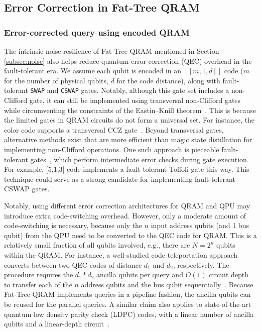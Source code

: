 \subsection{Error Correction in Fat-Tree QRAM}
\label{subsec:qec}
\subsubsection{Error-corrected query using encoded QRAM}
The intrinsic noise resilience of Fat-Tree QRAM mentioned in Section \ref{subsec:noise} also helps reduce quantum error correction (QEC) overhead in the fault-tolerant era. We assume each qubit is encoded in an $[[m, 1, d]]$ code ($m$ for the number of physical qubits, $d$ for the code distance), along with fault-tolerant  \texttt{SWAP} and \texttt{CSWAP} gates. Notably, although this gate set includes a non-Clifford gate, it can still be implemented using transversal non-Clifford gates while circumventing the constraints of the Eastin–Knill theorem~\cite{eastin2009restrictions}. This is because the limited gates in QRAM circuits do not form a universal set.
For instance, the color code supports a transversal CCZ gate~\cite{kubica2015unfolding}. Beyond transversal gates, alternative methods exist that are more efficient than magic state distillation for implementing non-Clifford operations. One such approach is pieceable fault-tolerant gates~\cite{yoder2016universal}, which perform intermediate error checks during gate execution. For example, [5,1,3] code implements a fault-tolerant Toffoli gate this way. This technique could serve as a strong candidate for implementing fault-tolerant CSWAP gates.

Notably, using different error correction architectures for QRAM and QPU may introduce extra code-switching overhead.  However, only a moderate amount of code-switching is necessary, because only the $n$ input address qubits (and 1 bus qubit) from the QPU need to be converted to the QEC code for QRAM. This is a relatively small fraction of all qubits involved, e.g., there are $N = 2^n$ qubits within the QRAM. For instance, a well-studied code teleportation approach converts between two QEC codes of distance $d_1$ and $d_2$, respectively. The procedure requires the $d_1 * d_2$ ancilla qubits per query and $O(1)$ circuit depth to transfer each of the $n$ address qubits and the bus qubit sequentially~\cite{xu2024constant}. Because Fat-Tree QRAM implements queries in a pipeline fashion, the ancilla qubits can be reused for the parallel queries. A similar claim also applies to state-of-the-art quantum low density parity check (LDPC) codes, with a linear number of ancilla qubits and a linear-depth circuit~\cite{cross2024improved}.

